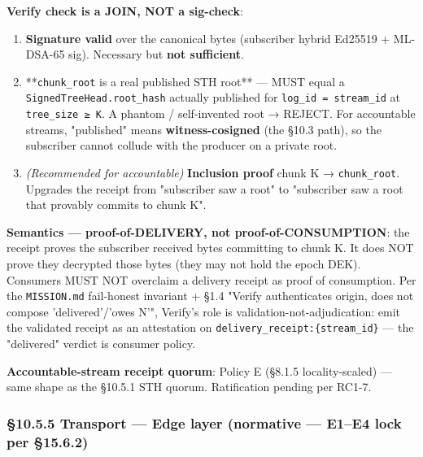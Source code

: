 \documentclass[10pt]{article}
\begin{document}
\textbf{Verify check is a JOIN, NOT a sig-check}:


\begin{enumerate}\setlength\itemsep{0pt}
\item \textbf{Signature valid} over the canonical bytes (subscriber hybrid Ed25519 + ML-DSA-65 sig). Necessary but \textbf{not sufficient}.
\item **\texttt{chunk\_root} is a real published STH root** — MUST equal a \texttt{SignedTreeHead.root\_hash} actually published for \texttt{log\_id = stream\_id} at \texttt{tree\_size ≥ K}. A phantom / self-invented root → REJECT. For accountable streams, "published" means \textbf{witness-cosigned} (the §10.3 path), so the subscriber cannot collude with the producer on a private root.
\item \textit{(Recommended for accountable)} \textbf{Inclusion proof} chunk K → \texttt{chunk\_root}. Upgrades the receipt from "subscriber saw a root" to "subscriber saw a root that provably commits to chunk K".
\end{enumerate}


\textbf{Semantics — proof-of-DELIVERY, not proof-of-CONSUMPTION}: the receipt proves the subscriber received bytes committing to chunk K. It does NOT prove they decrypted those bytes (they may not hold the epoch DEK). Consumers MUST NOT overclaim a delivery receipt as proof of consumption. Per the \texttt{MISSION.md} fail-honest invariant + §1.4 "Verify authenticates origin, does not compose 'delivered'/'owes N'", Verify's role is validation-not-adjudication: emit the validated receipt as an attestation on \texttt{delivery\_receipt:\{stream\_id\}} — the "delivered" verdict is consumer policy.


\textbf{Accountable-stream receipt quorum}: Policy E (§8.1.5 locality-scaled) — same shape as the §10.5.1 STH quorum. Ratification pending per RC1-7.


\subsubsection*{§10.5.5 Transport — Edge layer (normative — E1–E4 lock per §15.6.2)}
\end{document}
